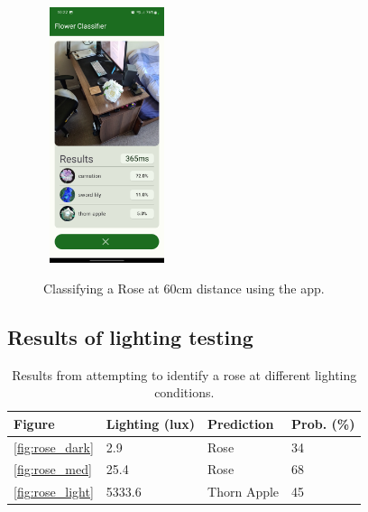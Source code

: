 \documentclass[12pt,a4paper]{report}
\begin{document}
\begin{figure}[h]\
    \includegraphics[width=0.3\textwidth]{rose_60cm.jpg}
    \caption{Classifying a Rose at 60cm distance using the app.}
    \label{fig:rose_60}
\end{figure}

\clearpage

\subsection{Results of lighting testing}
\label{subsec:lighting}

\begin{table}[h!]
    \begin{tabular}{ |l|l|l|l| }
        \hline
        Figure & Lighting (lux) & Prediction & Prob. (\%)\\
        \hline
        \ref{fig:rose_dark} & 2.9 & Rose & 34 \\
        \hline
        \ref{fig:rose_med} & 25.4 & Rose & 68 \\
        \hline
        \ref{fig:rose_light} & 5333.6 & Thorn Apple & 45 \\
        \hline
    \end{tabular}
    \caption{Results from attempting to identify a rose at different lighting conditions.}
    \label{table:lighting}
\end{table}
\end{document}
